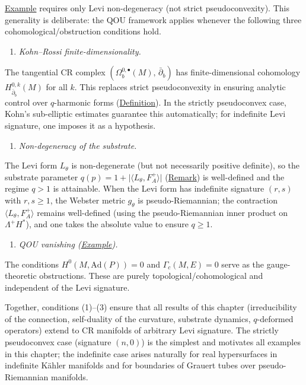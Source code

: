 \begin{remark}
  \label{rem:levi-generalisation}
\hyperref[def:c-quantum-universe]{Example} requires only Levi non-degeneracy
(not strict pseudoconvexity). This generality is deliberate: the QOU
framework applies whenever the following three cohomological/obstruction
conditions hold.

\begin{enumerate}
  \item \emph{Kohn--Rossi finite-dimensionality.}
\end{enumerate}
   The tangential CR complex
   $(\Omega^{0,\bullet}_b(M),\, \bar\partial_b)$ has
   finite-dimensional cohomology
   $H^{0,k}_{\bar\partial_b}(M)$ for all $k$. This replaces
   strict pseudoconvexity in ensuring analytic control over
   $q$-harmonic forms (\hyperref[def:q-harmonic-form]{Definition}).
   In the strictly pseudoconvex case, Kohn's sub-elliptic
   estimates guarantee this automatically; for indefinite
   Levi signature, one imposes it as a hypothesis.
\begin{enumerate}
  \item \emph{Non-degeneracy of the substrate.}
\end{enumerate}
   The Levi form $L_\theta$ is non-degenerate (but not necessarily
   positive definite), so the substrate parameter
   $q(p) = 1 + \lvert\langle L_\theta, F_A^+\rangle\rvert$
   (\hyperref[rem:c-substrate-via-levi]{Remark}) is well-defined and
   the regime $q > 1$ is attainable. When the Levi form has
   indefinite signature $(r,s)$ with $r,s \geq 1$, the Webster
   metric $g_\theta$ is pseudo-Riemannian; the contraction
   $\langle L_\theta, F_A^+\rangle$ remains well-defined (using
   the pseudo-Riemannian inner product on $\Lambda^+ H^*$), and
   one takes the absolute value to ensure $q \geq 1$.
\begin{enumerate}
  \item \emph{QOU vanishing (\hyperref[def:c-quantum-observable-universe]{Example}).}
\end{enumerate}
   The conditions $H^0(M, \mathrm{Ad}(P)) = 0$ and
   $\Gamma_c(M,E) = 0$ serve as the gauge-theoretic obstructions.
   These are purely topological/cohomological and independent of the
   Levi signature.

Together, conditions (1)--(3) ensure that all results of this chapter
(irreducibility of the connection, self-duality of the curvature,
substrate dynamics, $q$-deformed operators) extend to CR manifolds of
arbitrary Levi signature. The strictly pseudoconvex case (signature
$(n,0)$) is the simplest and motivates all examples in this chapter;
the indefinite case arises naturally for real hypersurfaces in
indefinite Kähler manifolds and for boundaries of
Grauert tubes over pseudo-Riemannian manifolds.
\end{remark}

